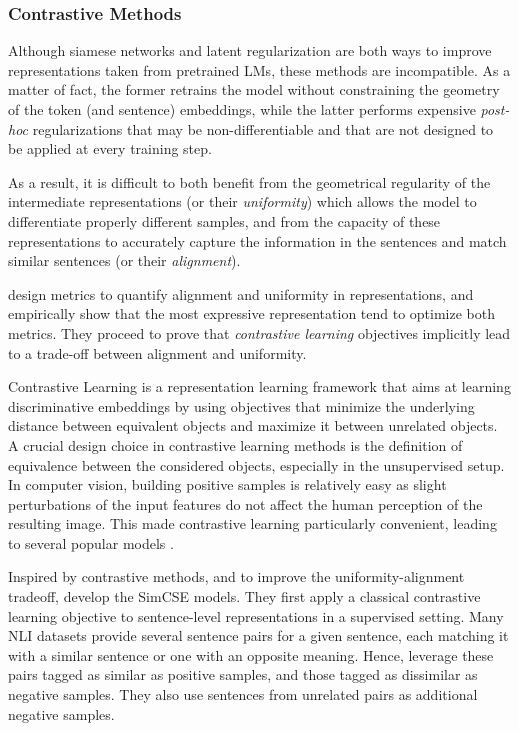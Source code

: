 \subsubsection{Contrastive Methods}

Although siamese networks and latent regularization are both ways to improve representations taken from pretrained LMs, these methods are incompatible. As a matter of fact, the former retrains the model without constraining the geometry of the token (and sentence) embeddings, while the latter performs expensive \textit{post-hoc} regularizations that may be non-differentiable and that are not designed to be applied at every training step.

As a result, it is difficult to both benefit from the geometrical regularity of the intermediate representations (or their \textit{uniformity}) which allows the model to differentiate properly different samples, and from the capacity of these representations to accurately capture the information in the sentences and match similar sentences (or their \textit{alignment}).

\citet{pmlr-v119-wang20k} design metrics to quantify alignment and uniformity in representations, and empirically show that the most expressive representation tend to optimize both metrics. They proceed to prove that \textit{contrastive learning} objectives implicitly lead to a trade-off between alignment and uniformity.

Contrastive Learning is a representation learning framework that aims at learning discriminative embeddings by using objectives that minimize the underlying distance between equivalent objects and maximize it between unrelated objects. A crucial design choice in contrastive learning methods is the definition of equivalence between the considered objects, especially in the unsupervised setup. In computer vision, building positive samples is relatively easy as slight perturbations of the input features do not affect the human perception of the resulting image. This made contrastive learning particularly convenient, leading to several popular models \citep{simclr, He_2020_CVPR}.

Inspired by contrastive methods, and to improve the uniformity-alignment tradeoff, \citet{gao-etal-2021-simcse} develop the SimCSE models. They first apply a classical contrastive learning objective to sentence-level representations in a supervised setting. Many NLI datasets provide several sentence pairs for a given sentence, each matching it with a similar sentence or one with an opposite meaning. Hence, \citet{gao-etal-2021-simcse} leverage these pairs tagged as similar as positive samples, and those tagged as dissimilar as negative samples. They also use sentences from unrelated pairs as additional negative samples. 

